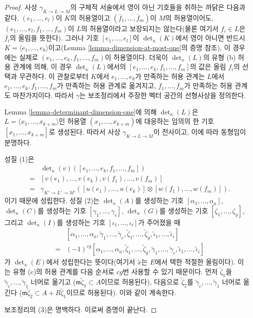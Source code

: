 \begin{proof}
사상 $\gamma_{K \to L \to M}$의 구체적 서술에서 영이 아닌 기호들을
취하는 까닭은 다음과 같다. $(e_1, \ldots, e_l)$이 $K$의 허용열이고
$(\overline{f}_1, \ldots, \overline{f}_m)$이 $M$의 허용열이어도,
$(e_1, \ldots, e_l, f_1, \ldots, f_m)$이 $L$의 허용열이라고 보장되지는
않는다(물론 여기서 $f_i \in L$은 $\overline{f}_i$의 올림을 뜻한다).
그러나 기호 $[e_1, \ldots, e_l]$이 $\det_\kappa(K)$에서 영이 아니면
반드시 $K = \langle e_1, \ldots, e_k\rangle$이고(Lemma
\ref{lemma-dimension-at-most-one}의 증명 참조), 이 경우에는 실제로
$(e_1, \ldots, e_k, f_1, \ldots, f_m)$이 허용열이다.
더욱이 $\det_\kappa(L)$의 유형 (b) 허용 관계에 의해, 이 경우
$\det_\kappa(L)$에서의 $[e_1, \ldots, e_k, f_1, \ldots, f_m]$의 값은
올림 $f_i$의 선택과 무관하다. 이 관찰로부터 $K$에서
$e_1, \ldots, e_k$가 만족하는 허용 관계는 $L$에서
$e_1, \ldots, e_k, f_1, \ldots, f_m$가 만족하는 허용 관계로 옮겨지고,
$\overline{f}_1, \ldots, \overline{f}_m$가 만족하는 허용 관계도
마찬가지이다. 따라서 $\gamma$는 보조정리에서 주장한 벡터 공간의
선형사상을 정의한다.

\medskip\noindent
Lemma \ref{lemma-determinant-dimension-one}에 의해 $\det_\kappa(L)$은
$L = \langle x_1, \ldots, x_{k + m}\rangle$인 허용열
$(x_1, \ldots, x_{k + m})$에 대응하는 임의의 한 기호
$[x_1, \ldots, x_{k + m}]$로 생성된다. 따라서 사상
$\gamma_{K \to L \to M}$이 전사이고, 이에 따라 동형임이 분명하다.

\medskip\noindent
성질 (1)은
\begin{eqnarray*}
& & \det\nolimits_\kappa(v)([e_1, \ldots, e_k, f_1, \ldots, f_m]) \\
& = &
[v(e_1), \ldots, v(e_k), v(f_1), \ldots, v(f_m)] \\
& = &
\gamma_{K' \to L' \to M'}([u(e_1), \ldots, u(e_k)]
\otimes [w(f_1), \ldots, w(f_m)]).
\end{eqnarray*}
이기 때문에 성립한다. 성질 (2)는 $\det_\kappa(A)$를 생성하는 기호
$[\alpha_1, \ldots, \alpha_a]$, $\det_\kappa(C)$를 생성하는 기호
$[\gamma_1, \ldots, \gamma_c]$, $\det_\kappa(G)$를 생성하는 기호
$[\zeta_1, \ldots, \zeta_g]$, 그리고 $\det_\kappa(I)$를 생성하는 기호
$[\iota_1, \ldots, \iota_i]$가 주어졌을 때
\begin{eqnarray*}
& & [\alpha_1, \ldots, \alpha_a, \tilde\gamma_1, \ldots, \tilde\gamma_c,
\tilde\zeta_1, \ldots, \tilde\zeta_g, \tilde\iota_1, \ldots, \tilde\iota_i] \\
& = &
(-1)^{cg} [\alpha_1, \ldots, \alpha_a, \tilde\zeta_1, \ldots, \tilde\zeta_g,
\tilde\gamma_1, \ldots, \tilde\gamma_c, \tilde\iota_1, \ldots, \tilde\iota_i]
\end{eqnarray*}
가 $\det_\kappa(E)$에서 성립한다는 뜻이다(여기서 $\tilde{x}$는
$E$에서 택한 적절한 올림이다). 이는 유형 (c)의 허용 관계를 다음
순서로 $cg$번 사용할 수 있기 때문이다. 먼저 $\tilde\zeta_1$을
$\tilde\gamma_c, \ldots, \tilde\gamma_1$ 너머로 옮기고
($\mathfrak m\tilde\zeta_1 \subset A$이므로 허용된다), 다음으로
$\tilde\zeta_2$를 $\tilde\gamma_c, \ldots, \tilde\gamma_1$ 너머로 옮긴다
($\mathfrak m\tilde\zeta_2 \subset A + R\tilde\zeta_1$이므로 허용된다).
이와 같이 계속한다.

\medskip\noindent
보조정리의 (3)은 명백하다. 이로써 증명이 끝난다.
\end{proof}

